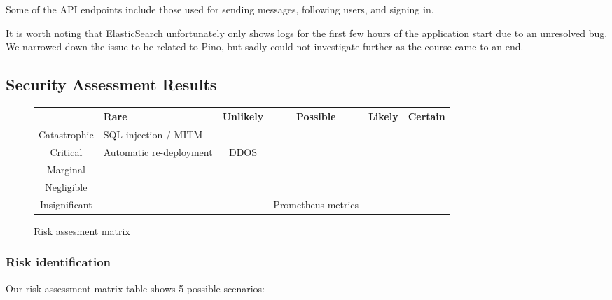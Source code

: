 \documentclass{article}
\begin{document}
Some of the API endpoints include those used for sending messages, following users, and signing in.

It is worth noting that ElasticSearch unfortunately only shows logs for the first few hours of the application start due to an unresolved bug. We narrowed down the issue to be related to Pino, but sadly could not investigate further as the course came to an end.

\subsection{Security Assessment Results}

\begin{figure}[H]

\begin{center}
    \begin{tabular}{ |c|p{12em}|c|c|c|c| } 
        \hline
        & Rare & Unlikely & Possible & Likely & Certain \\
        \hline
        Catastrophic & SQL injection / MITM  \cellcolor{orange} & \cellcolor{orange} &  \cellcolor{red} &  \cellcolor{red} & \cellcolor{red} \\ 
        \hline
        Critical &  Automatic re-deployment \cellcolor{orange} & DDOS \cellcolor{orange} &  \cellcolor{orange} & \cellcolor{red} &  \cellcolor{red}\\ 
        \hline
        Marginal &  \cellcolor{green} & \cellcolor{orange}  &  \cellcolor{orange} &  \cellcolor{orange} &  \cellcolor{red} \\ 
        \hline
        Negligible &  \cellcolor{green} & \cellcolor{green}   &  \cellcolor{orange} &  \cellcolor{orange} &   \cellcolor{orange} \\ 
        \hline
        Insignificant & \cellcolor{green} \cellcolor{green} & \cellcolor{green} &  Prometheus metrics \cellcolor{green} &  \cellcolor{orange} &  \cellcolor{orange} \\
        \hline
    \end{tabular}
\end{center}
    \centering
    \caption{Risk assesment matrix}
\end{figure}

\subsubsection{Risk identification}
Our risk assessment matrix table shows 5 possible scenarios:
\end{document}
